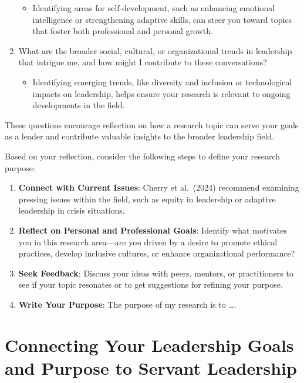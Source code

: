 \documentclass[
  letterpaper,
  DIV=11,
  numbers=noendperiod]{scrreprt}
\providecommand{\tightlist}{%
  \setlength{\itemsep}{0pt}\setlength{\parskip}{0pt}}\usepackage{longtable,booktabs,array}
\begin{document}
\begin{enumerate}
  \begin{itemize}
  \tightlist
  \item
    Identifying areas for self-development, such as enhancing emotional
    intelligence or strengthening adaptive skills, can steer you toward
    topics that foster both professional and personal growth.
  \end{itemize}
\item
  What are the broader social, cultural, or organizational trends in
  leadership that intrigue me, and how might I contribute to these
  conversations?

  \begin{itemize}
  \tightlist
  \item
    Identifying emerging trends, like diversity and inclusion or
    technological impacts on leadership, helps ensure your research is
    relevant to ongoing developments in the field.
  \end{itemize}
\end{enumerate}

These questions encourage reflection on how a research topic can serve
your goals as a leader and contribute valuable insights to the broader
leadership field.

Based on your reflection, consider the following steps to define your
research purpose:

\begin{enumerate}
\def\labelenumi{\arabic{enumi}.}
\tightlist
\item
  \textbf{Connect with Current Issues}: Cherry et al.~(2024) recommend
  examining pressing issues within the field, such as equity in
  leadership or adaptive leadership in crisis situations.
\item
  \textbf{Reflect on Personal and Professional Goals}: Identify what
  motivates you in this research area---are you driven by a desire to
  promote ethical practices, develop inclusive cultures, or enhance
  organizational performance?
\item
  \textbf{Seek Feedback}: Discuss your ideas with peers, mentors, or
  practitioners to see if your topic resonates or to get suggestions for
  refining your purpose.
\item
  \textbf{Write Your Purpose}: The purpose of my research is to \ldots.
\end{enumerate}


\chapter*{Connecting Your Leadership Goals and Purpose to Servant
Leadership}\label{connecting-your-leadership-goals-and-purpose-to-servant-leadership}
\end{document}
